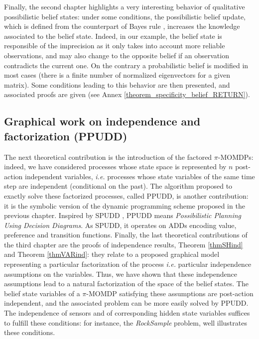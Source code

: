 Finally, the second chapter highlights 
a very interesting behavior 
of qualitative possibilistic belief states:
under some conditions, 
the possibilistic belief update, 
which is defined from the counterpart of Bayes rule \cite{Dubois199023},
increases the knowledge associated to the belief state.
Indeed, in our example, 
the belief state is responsible of the imprecision 
as it only takes into account 
more reliable observations,
and may also change to the opposite belief
if an observation contradicts the current one.
On the contrary a probabilistic belief 
is modified in most cases
(there is a finite number of normalized eigenvectors for a given matrix). 
Some conditions leading to this behavior 
are then presented,
and associated proofs are given 
(see Annex \ref{theorem_specificity_belief_RETURN}).

\subsection*{Graphical work on independence and factorization (PPUDD)}
The next theoretical contribution is 
the introduction of the factored $\pi$-MOMDPs:
indeed, we have considered processes
whose state space is represented by $n$ 
post-action independent variables,
\textit{i.e.} processes whose 
state variables of the same time step
are independent (conditional on the past).
The algorithm proposed to exactly solve 
these factorized processes,
called PPUDD, is another contribution:
it is the symbolic version of 
the dynamic programming scheme 
proposed in the previous chapter.
Inspired by SPUDD \cite{Hoey99spudd:stochastic}, 
PPUDD means \emph{Possibilistic Planning Using Decision Diagrams}. 
As SPUDD, it operates on ADDs 
encoding value, preference and transition functions.
Finally, the last theoretical contributions of the third chapter
are the proofs of independence results,
Theorem \ref{thmSHind} and Theorem \ref{thmVARind}:
they relate to a proposed graphical model
representing a particular factorization of the process
\textit{i.e.} particular independence assumptions
on the variables.
Thus, we have shown that 
these independence assumptions
lead to a natural factorization 
of the space of the belief states.
The belief state variables of a $\pi$-MOMDP 
satisfying these assumptions
are post-action independent,
and the associated problem 
can be more easily solved by PPUDD. 
The independence of sensors 
and of corresponding hidden state variables 
suffices to fulfill these conditions:
for instance, the \textit{RockSample} problem, 
well illustrates these conditions.

